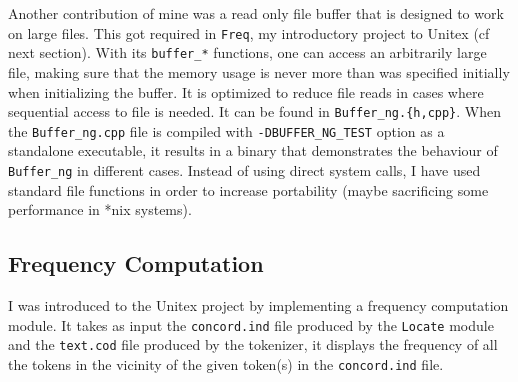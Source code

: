 \documentclass[a4paper,12pt,oneside]{article}
\begin{document}
Another contribution of mine was a read only file buffer that is designed to work on large files. This got required in \texttt{Freq}, my introductory project to Unitex (cf next section). With its \texttt{buffer\_*} functions, one can access an arbitrarily large file, making sure that the memory usage is never more than was specified initially when initializing the buffer. It is optimized to reduce file reads in cases where sequential access to file is needed. It can be found in \texttt{Buffer\_ng.\{h,cpp\}}. When the \texttt{Buffer\_ng.cpp} file is compiled with \texttt{-DBUFFER\_NG\_TEST} option as a standalone executable, it results in a binary that demonstrates the behaviour of \texttt{Buffer\_ng} in different cases. Instead of using direct system calls, I have used standard file functions in order to increase portability (maybe sacrificing some performance in *nix systems).

\subsection{Frequency Computation}
I was introduced to the Unitex project by implementing a frequency computation module. It takes as input the \texttt{concord.ind} file produced by the \texttt{Locate} module and the \texttt{text.cod} file produced by the tokenizer, it displays the frequency of all the tokens in the vicinity of the given token(s) in the \texttt{concord.ind} file.


\end{document}
